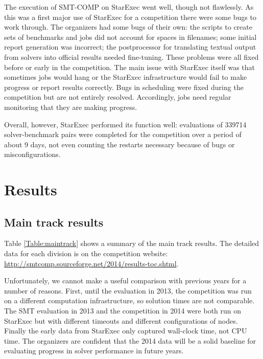 \documentclass[twoside,11pt]{article}
\begin{document}
The execution of SMT-COMP on StarExec went well, though not flawlessly. As this was a first major use of StarExec for a competition there were some bugs to work through.
The organizers had some bugs of their own: the scripts to create sets of benchmarks and jobs did not account for spaces in filenames; some initial report generation was incorrect; the postprocessor for translating textual output from solvers into official results needed fine-tuning. These problems were all fixed before or early in the competition. The main issue with StarExec itself was that sometimes jobs would hang or the StarExec infrastructure would fail to make 
progress or report results correctly. Bugs in scheduling were
fixed during the competition but are not entirely resolved. Accordingly, jobs need regular monitoring that they are making progress.

Overall, however, StarExec performed its function well: evaluations of 339714 solver-benchmark pairs were completed for the competition over a period of about 9 days, not even counting the restarts necessary because of bugs or misconfigurations.

\section{Results}
\label{sec:results}

\subsection{Main track results}
\label{sec:timeouts}

Table \ref{Table:maintrack} shows a summary of the main track results. The detailed data for each division is on the competition website: \url{http://smtcomp.sourceforge.net/2014/results-toc.shtml}.

Unfortunately, we cannot make a useful comparison with previous years for a number of reasons. First, until the evaluation in 2013, the competition was run on a different computation infrastructure, so solution times are not comparable. The SMT evaluation in 2013 and the competition in 2014 were both run on StarExec but with different timeouts and different configurations of nodes. Finally the early data from StarExec only captured wall-clock time, not CPU time. The organizers are confident that the 2014 data will be a solid baseline for evaluating progress in solver performance in future years.
 
\end{document}
